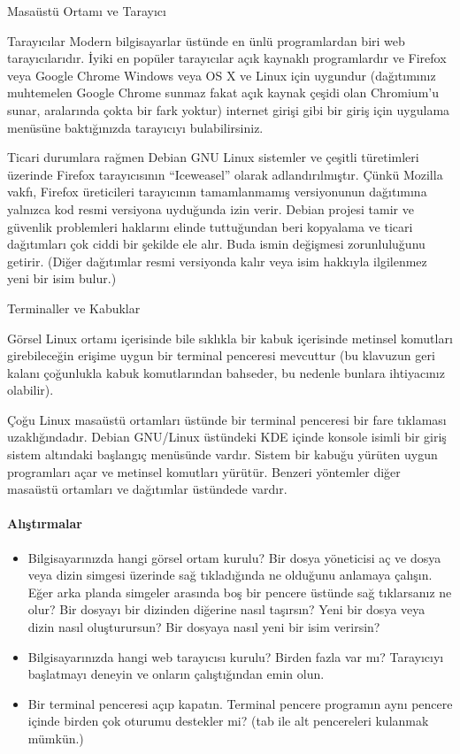 \begin{section}{Masaüstü Ortamı ve Tarayıcı}
\begin{subsection}{Tarayıcılar}
Modern bilgisayarlar üstünde en ünlü programlardan biri web tarayıcılarıdır. İyiki en popüler tarayıcılar açık kaynaklı programlardır ve Firefox veya Google Chrome Windows veya OS X ve Linux için uygundur (dağıtımınız muhtemelen Google Chrome sunmaz fakat açık kaynak çeşidi olan Chromium’u sunar, aralarında çokta bir fark yoktur) internet girişi gibi bir giriş için uygulama menüsüne baktığınızda tarayıcıyı bulabilirsiniz.

Ticari durumlara rağmen Debian GNU Linux sistemler ve çeşitli türetimleri üzerinde Firefox tarayıcısının  “Iceweasel” olarak adlandırılmıştır. Çünkü Mozilla vakfı, Firefox üreticileri tarayıcının tamamlanmamış versiyonunun dağıtımına yalnızca kod resmi versiyona  uyduğunda izin verir. Debian projesi tamir ve güvenlik problemleri haklarını elinde tuttuğundan beri kopyalama ve ticari dağıtımları çok ciddi bir şekilde ele alır. Buda ismin değişmesi zorunluluğunu getirir. (Diğer dağıtımlar resmi versiyonda kalır veya isim hakkıyla ilgilenmez yeni bir isim bulur.) 
\end{subsection}
\begin{subsection}{Terminaller ve Kabuklar}

Görsel Linux ortamı içerisinde bile sıklıkla bir kabuk içerisinde metinsel komutları girebileceğin erişime uygun bir terminal penceresi mevcuttur (bu klavuzun geri kalanı çoğunlukla kabuk komutlarından bahseder, bu nedenle bunlara ihtiyacınız olabilir).

Çoğu Linux masaüstü ortamları üstünde bir terminal penceresi bir fare tıklaması uzaklığındadır. Debian GNU/Linux üstündeki KDE içinde konsole isimli bir giriş sistem altındaki başlangıç menüsünde vardır. Sistem bir kabuğu yürüten uygun programları açar ve metinsel komutları yürütür. Benzeri yöntemler diğer masaüstü ortamları ve dağıtımlar üstündede vardır.
\end{subsection}

\paragraph{Alıştırmalar}{
\begin{itemize}
 \item Bilgisayarınızda hangi görsel ortam kurulu? Bir dosya yöneticisi aç ve dosya veya dizin simgesi üzerinde sağ tıkladığında ne olduğunu anlamaya çalışın. Eğer arka planda simgeler arasında boş bir pencere üstünde sağ tıklarsanız ne olur? Bir dosyayı bir dizinden diğerine nasıl taşırsın? Yeni bir dosya veya dizin nasıl oluşturursun? Bir dosyaya nasıl yeni bir isim verirsin?
 \item Bilgisayarınızda hangi web tarayıcısı kurulu? Birden fazla var mı? Tarayıcıyı başlatmayı deneyin ve onların çalıştığından emin olun.
 \item Bir terminal penceresi açıp kapatın. Terminal pencere programın aynı pencere içinde birden çok oturumu destekler mi? (tab ile alt pencereleri kulanmak mümkün.)
\end{itemize}}
\end{section}
